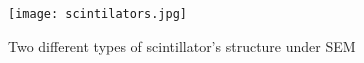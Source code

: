 \begin{figure}[h]
\texttt{[image: scintilators.jpg]}
\caption{Two different types of scintillator's structure under SEM}
\label{fig:scintillators}
\end{figure}




